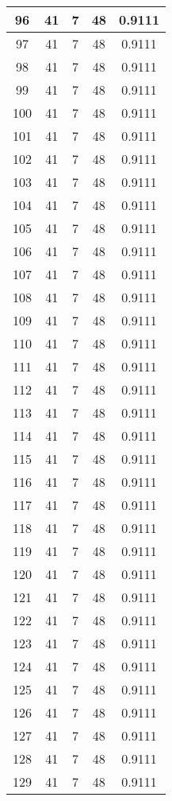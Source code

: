 \documentclass[letterpaper, 12pt]{article}
\begin{document}
\begin{longtable}{|c|c|c|c|c|}
\hline
96 & 41 & 7 & 48 & 0.9111 \\
\hline
97 & 41 & 7 & 48 & 0.9111 \\
\hline
98 & 41 & 7 & 48 & 0.9111 \\
\hline
99 & 41 & 7 & 48 & 0.9111 \\
\hline
100 & 41 & 7 & 48 & 0.9111 \\
\hline
101 & 41 & 7 & 48 & 0.9111 \\
\hline
102 & 41 & 7 & 48 & 0.9111 \\
\hline
103 & 41 & 7 & 48 & 0.9111 \\
\hline
104 & 41 & 7 & 48 & 0.9111 \\
\hline
105 & 41 & 7 & 48 & 0.9111 \\
\hline
106 & 41 & 7 & 48 & 0.9111 \\
\hline
107 & 41 & 7 & 48 & 0.9111 \\
\hline
108 & 41 & 7 & 48 & 0.9111 \\
\hline
109 & 41 & 7 & 48 & 0.9111 \\
\hline
110 & 41 & 7 & 48 & 0.9111 \\
\hline
111 & 41 & 7 & 48 & 0.9111 \\
\hline
112 & 41 & 7 & 48 & 0.9111 \\
\hline
113 & 41 & 7 & 48 & 0.9111 \\
\hline
114 & 41 & 7 & 48 & 0.9111 \\
\hline
115 & 41 & 7 & 48 & 0.9111 \\
\hline
116 & 41 & 7 & 48 & 0.9111 \\
\hline
117 & 41 & 7 & 48 & 0.9111 \\
\hline
118 & 41 & 7 & 48 & 0.9111 \\
\hline
119 & 41 & 7 & 48 & 0.9111 \\
\hline
120 & 41 & 7 & 48 & 0.9111 \\
\hline
121 & 41 & 7 & 48 & 0.9111 \\
\hline
122 & 41 & 7 & 48 & 0.9111 \\
\hline
123 & 41 & 7 & 48 & 0.9111 \\
\hline
124 & 41 & 7 & 48 & 0.9111 \\
\hline
125 & 41 & 7 & 48 & 0.9111 \\
\hline
126 & 41 & 7 & 48 & 0.9111 \\
\hline
127 & 41 & 7 & 48 & 0.9111 \\
\hline
128 & 41 & 7 & 48 & 0.9111 \\
\hline
129 & 41 & 7 & 48 & 0.9111 \\

\end{longtable}
\end{document}
